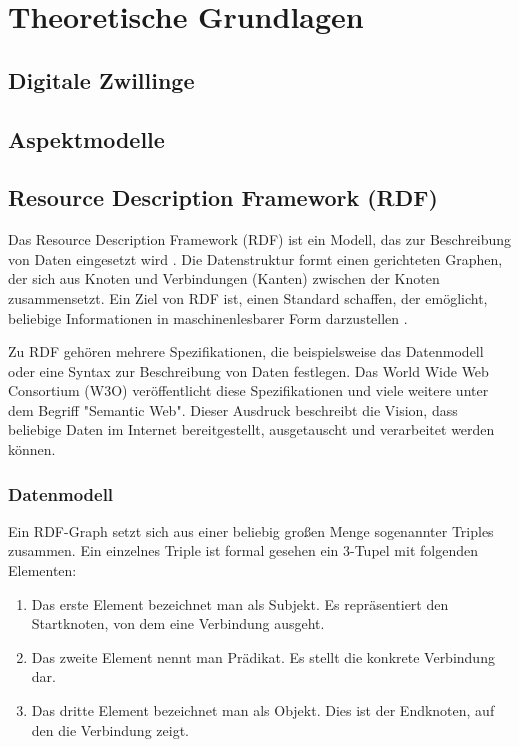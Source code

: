 \chapter{Theoretische Grundlagen}
\fancyhfStyleContent{}


\section{Digitale Zwillinge}
\section{Aspektmodelle}
\section{Resource Description Framework (RDF)}

Das Resource Description Framework (RDF) ist ein Modell, das zur Beschreibung von Daten eingesetzt wird \cite[vgl.][]{w3c2014rdf}. Die Datenstruktur formt einen gerichteten Graphen, der sich aus Knoten und Verbindungen (Kanten) zwischen der Knoten zusammensetzt. Ein Ziel von RDF ist, einen Standard schaffen, der emöglicht, beliebige Informationen in maschinenlesbarer Form darzustellen \cite[vgl.][Sektion 2]{w3c2014rdfprimer}.

Zu RDF gehören mehrere Spezifikationen, die beispielsweise das Datenmodell oder eine Syntax zur Beschreibung von Daten festlegen. Das World Wide Web Consortium (W3O) veröffentlicht diese Spezifikationen und viele weitere unter dem Begriff "Semantic Web". Dieser Ausdruck beschreibt die Vision, dass beliebige Daten im Internet bereitgestellt, ausgetauscht und verarbeitet werden können. \cite[vgl.][]{w3c2014semanticweb}

\subsection{Datenmodell}

Ein RDF-Graph setzt sich aus einer beliebig großen Menge sogenannter Triples zusammen. \cite[vgl.][Sektion 3.1]{w3c2014rdfconcepts} Ein einzelnes Triple ist formal gesehen ein 3-Tupel mit folgenden Elementen:
\begin{enumerate}
	\item Das erste Element bezeichnet man als Subjekt. Es repräsentiert den Startknoten, von dem eine Verbindung ausgeht.
	\item Das zweite Element nennt man Prädikat. Es stellt die konkrete Verbindung dar.
	\item Das dritte Element bezeichnet man als Objekt. Dies ist der Endknoten, auf den die Verbindung zeigt. 
\end{enumerate}

